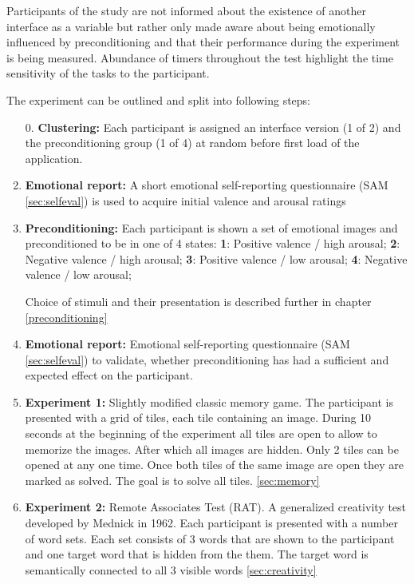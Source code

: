 	Participants of the study are not informed about the existence of another interface as a variable but rather only made aware about being emotionally influenced by preconditioning and that their performance during the experiment is being measured. Abundance of timers throughout the test highlight the time sensitivity of the tasks to the participant.
	
	The experiment can be outlined and split into following steps:
	
	\begin{enumerate}
		
		\item[0.] \textbf{Clustering:} Each participant is assigned an interface version (1 of 2) and the preconditioning group (1 of 4) at random before first load of the application.
		
		\item \textbf{Emotional report:} A short emotional self-reporting questionnaire (SAM \ref{sec:selfeval}) is used to acquire initial valence and arousal ratings
		
		\item \textbf{Preconditioning:} Each participant is shown a set of emotional images and preconditioned to be in one of 4 states:
			\textbf{1}: Positive valence / high arousal;
			\textbf{2}: Negative valence / high arousal;
			\textbf{3}: Positive valence / low arousal;
			\textbf{4}: Negative valence / low arousal;
			
		Choice of stimuli and their presentation is described further in chapter \ref{preconditioning}
			
		\item \textbf{Emotional report:} Emotional self-reporting questionnaire (SAM \ref{sec:selfeval}) to validate, whether preconditioning has had a sufficient and expected effect on the participant.
		
		\item \textbf{Experiment 1:} Slightly modified classic memory game. The participant is presented with a grid of tiles, each tile containing an image. During 10 seconds at the beginning of the experiment all tiles are open to allow to memorize the images. After which all images are hidden. Only 2 tiles can be opened at any one time. Once both tiles of the same image are open they are marked as solved. The goal is to solve all tiles. \ref{sec:memory}
		
		\item \textbf{Experiment 2:} Remote Associates Test (RAT). A generalized creativity test developed by Mednick \cite{Mednick1962} in 1962. Each participant is presented with a number of word sets. Each set consists of 3 words that are shown to the participant and one target word that is hidden from the them. The target word is semantically connected to all 3 visible words \ref{sec:creativity}
		

\end{enumerate}
